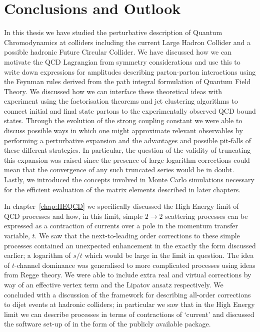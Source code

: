 
\chapter{Conclusions and Outlook}
\label{chap:conclusion}

In this thesis we have studied the perturbative description of Quantum Chromodynamics at colliders
including the current Large Hadron Collider and a possible hadronic Future Circular Collider.  We
have discussed how we can motivate the QCD Lagrangian from symmetry considerations and use this
to write down expressions for amplitudes describing parton-parton interactions using the Feynman
rules derived from the path integral formulation of Quantum Field Theory.  We discussed how we can
interface these theoretical ideas with experiment using the factorisation theorems and jet clustering
algorithms to connect initial and final state partons to the experimentally observed QCD bound states.
Through the evolution of the strong coupling constant we were able to discuss possible ways in which
one might approximate relevant observables by performing a perturbative expansion and the advantages
and possible pit-falls of these different strategies.  In particular, the question of the validity of
truncating this expansion was raised since the presence of large logarithm corrections could mean
that the convergence of any such truncated series would be in doubt.  Lastly, we introduced the concepts
involved in Monte Carlo simulations necessary for the efficient evaluation of the matrix elements
described in later chapters.

In chapter~\ref{chap:HEQCD} we specifically discussed the High Energy limit of QCD processes and
how, in this limit, simple $2\to2$ scattering processes can be expressed as a contraction of currents
over a pole in the momentum transfer variable, $t$.  We saw that the next-to-leading order corrections
to these simple processes contained an unexpected enhancement in the exactly the form discussed earlier;
a logarithm of $s/t$ which would be large in the limit in question.  The idea of $t$-channel dominance
was generalised to more complicated processes using ideas from Regge theory.  We were able to include
extra real and virtual corrections by way of an effective vertex term and the Lipatov ansatz respectively.
We concluded with a discussion of the \hej framework for describing all-order corrections to dijet events
at hadronic colliders; in particular we saw that in the High Energy limit we can describe processes in terms
of contractions of `current' and discussed the software set-up of \hej in the form of the publicly
available \HEJ package.

